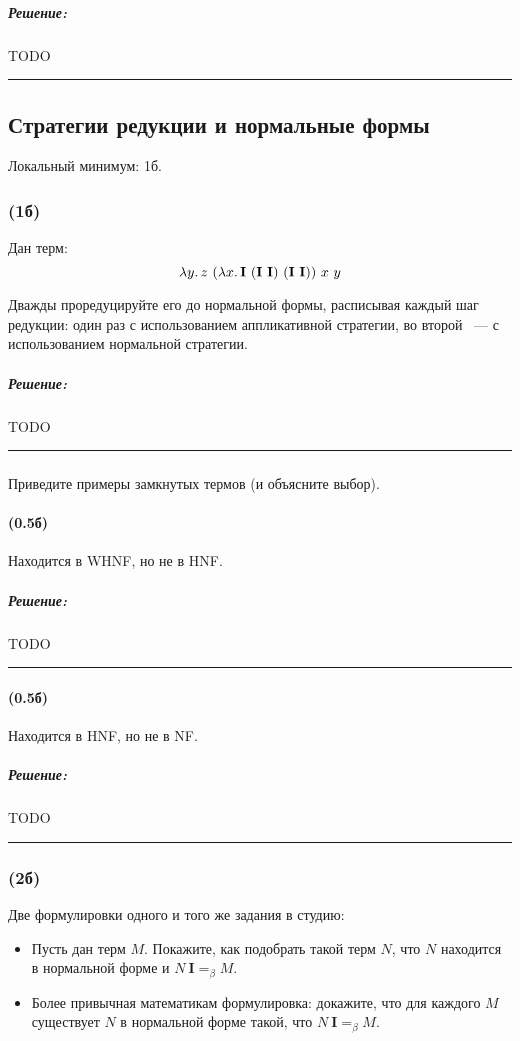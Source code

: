 \documentclass{article}
\newenvironment{proof}{\subparagraph{\hspace{-1em}Решение:\newline}}{\par\noindent\rule{\textwidth}{0.4pt}}
\newcommand{\comb}[1]{\mathbf{#1}}
\newcommand{\eqbeta}{=_\beta}
\begin{document}
    \begin{proof}
        TODO %
    \end{proof}

    \subsection{Стратегии редукции и нормальные формы}

    Локальный минимум: 1б.

    \subsubsection{(1б)}

    Дан терм:
    \[\lambda y\ldotp z~(\lambda x\ldotp \comb{I}~(\comb{I}~\comb{I})~(\comb{I}~\comb{I}))~x~y\]

    Дважды проредуцируйте его до нормальной формы, расписывая каждый шаг редукции: один раз с использованием аппликативной стратегии, во второй ~--- с
    использованием нормальной стратегии.

    \begin{proof}
        TODO %
    \end{proof}

    \subsubsection{}

    Приведите примеры замкнутых термов (и объясните выбор).

    \paragraph{(0.5б)}

    Находится в WHNF, но не в HNF.

    \begin{proof}
        TODO %
    \end{proof}

    \paragraph{(0.5б)}

    Находится в HNF, но не в NF.

    \begin{proof}
        TODO %
    \end{proof}

    \subsubsection{(2б)}

    Две формулировки одного и того же задания в студию:
    \begin{itemize}
        \item Пусть дан терм $M$.
        Покажите, как подобрать такой терм $N$, что $N$ находится в нормальной форме и $N~\comb{I} =_\beta M$.
        \item Более привычная математикам формулировка: докажите, что для каждого $M$ существует $N$ в нормальной форме такой, что $N~\comb{I} \eqbeta M$.
    \end{itemize}
\end{document}
